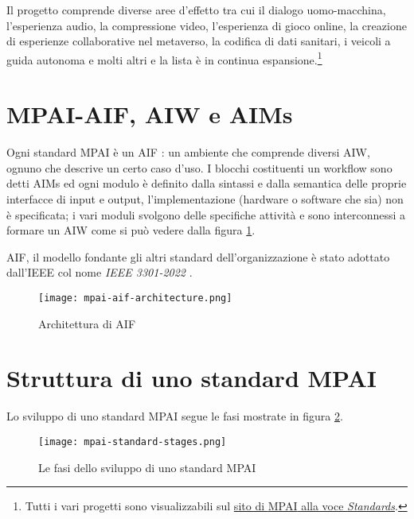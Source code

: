 Il progetto comprende diverse aree d'effetto tra cui il dialogo uomo-macchina, l'esperienza audio, la compressione video, l'esperienza di gioco online, la creazione di esperienze collaborative nel metaverso, la codifica di dati sanitari, i veicoli a guida autonoma e molti altri e la lista è in continua espansione.\footnote{Tutti i vari progetti sono visualizzabili sul \href{https://mpai.community/standards/}{sito di \ac{MPAI} alla voce \textit{Standards}}.}


\section{MPAI-AIF, \acs{AIW} e \acsp{AIM}} \label{sec:aif-aiw-aim}
Ogni standard \ac{MPAI} è un \ac{AIF} \cite{mpaiMPAIAIFMPAICommunity}: un ambiente che comprende diversi \ac{AIW}, ognuno che descrive un certo caso d'uso. I blocchi costituenti un workflow sono detti \acp{AIM} ed ogni modulo è definito dalla sintassi e dalla semantica delle proprie interfacce di input e output, l'implementazione (hardware o software che sia) non è specificata; i vari moduli svolgono delle specifiche attività e sono interconnessi a formare un AIW come si può vedere dalla figura \ref{fig:mpai-aif-architecture}.

\acs{AIF}, il modello fondante gli altri standard dell'organizzazione è stato adottato dall'\ac{IEEE} col nome \textit{IEEE 3301-2022} \cite{ieeeStandard3301-2022}.

\begin{figure}[h]
    \centering
    \texttt{[image: mpai-aif-architecture.png]}
    \caption{Architettura di \acs{AIF} \cite{leonardoBlogNewWayDevelop2020}}
    \label{fig:mpai-aif-architecture}
\end{figure}


\section{Struttura di uno standard MPAI} \label{sec:standard-mpai} %
Lo sviluppo di uno standard MPAI segue le fasi mostrate in figura \ref{fig:mpai-standard-stages}.    %

\begin{figure}[h]
    \centering
    \texttt{[image: mpai-standard-stages.png]}
    \caption{Le fasi dello sviluppo di uno standard \acs{MPAI} \cite{leonardoBlogNewWayDevelop2020}}
    \label{fig:mpai-standard-stages}
\end{figure}

